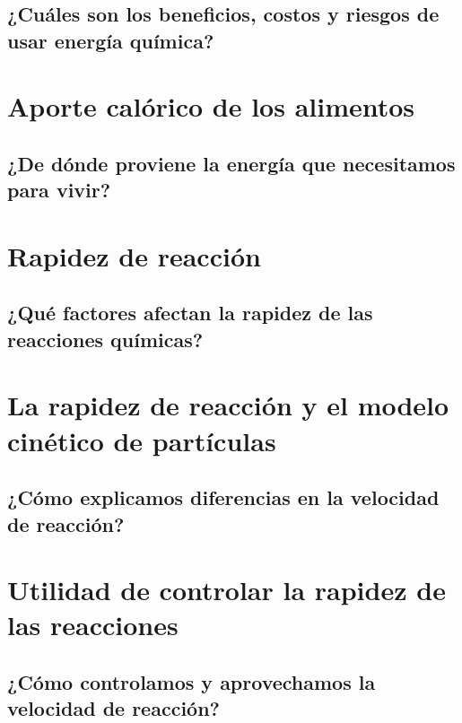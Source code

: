 \documentclass[11pt]{book}
\begin{document}
\subsection{¿Cuáles son los beneficios, costos y riesgos de usar energía química?}

\newpage
\section{Aporte calórico de los alimentos}
\subsection{¿De dónde proviene la energía que necesitamos para vivir?}

\newpage
\section{Rapidez de reacción}
\subsection{¿Qué factores afectan la rapidez de las reacciones químicas?}

\newpage
\section{La rapidez de reacción y el modelo cinético de partículas}
\subsection{¿Cómo explicamos diferencias en la velocidad de reacción?}

\newpage
\section{Utilidad de controlar la rapidez de las reacciones}
\subsection{¿Cómo controlamos y aprovechamos la velocidad de reacción?}
\end{document}
